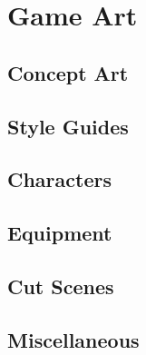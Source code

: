 
\section{Game Art}

\subsection{Concept Art}

\subsection{Style Guides}

\subsection{Characters}

\subsection{Equipment}

\subsection{Cut Scenes}

\subsection{Miscellaneous}

\newpage